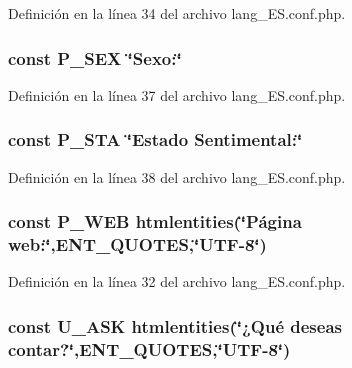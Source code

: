 Definición en la línea 34 del archivo lang\-\_\-\-E\-S.\-conf.\-php.

\hypertarget{lang__ES_8conf_8php_a695823c4efbb40f67bf068989d78c024}{
\subsubsection[{P\-\_\-\-S\-E\-X}]{\setlength{\rightskip}{0pt plus 5cm}const P\-\_\-\-S\-E\-X \char`\"{}Sexo\-:\char`\"{}}}\label{lang__ES_8conf_8php_a695823c4efbb40f67bf068989d78c024}


Definición en la línea 37 del archivo lang\-\_\-\-E\-S.\-conf.\-php.

\hypertarget{lang__ES_8conf_8php_a77097762c49f00afdf8fe7fd23b3498c}{
\subsubsection[{P\-\_\-\-S\-T\-A}]{\setlength{\rightskip}{0pt plus 5cm}const P\-\_\-\-S\-T\-A \char`\"{}Estado Sentimental\-:\char`\"{}}}\label{lang__ES_8conf_8php_a77097762c49f00afdf8fe7fd23b3498c}


Definición en la línea 38 del archivo lang\-\_\-\-E\-S.\-conf.\-php.

\hypertarget{lang__ES_8conf_8php_ade9836b8897b65809f548b7781e977e2}{
\subsubsection[{P\-\_\-\-W\-E\-B}]{\setlength{\rightskip}{0pt plus 5cm}const P\-\_\-\-W\-E\-B htmlentities(\char`\"{}Página web\-:\char`\"{},E\-N\-T\-\_\-\-Q\-U\-O\-T\-E\-S,\char`\"{}U\-T\-F-\/8\char`\"{})}}\label{lang__ES_8conf_8php_ade9836b8897b65809f548b7781e977e2}


Definición en la línea 32 del archivo lang\-\_\-\-E\-S.\-conf.\-php.

\hypertarget{lang__ES_8conf_8php_aade6029224a1af2dbad53ec0d454186f}{
\subsubsection[{U\-\_\-\-A\-S\-K}]{\setlength{\rightskip}{0pt plus 5cm}const U\-\_\-\-A\-S\-K htmlentities(\char`\"{}¿Qué deseas contar?\char`\"{},E\-N\-T\-\_\-\-Q\-U\-O\-T\-E\-S,\char`\"{}U\-T\-F-\/8\char`\"{})}}\label{lang__ES_8conf_8php_aade6029224a1af2dbad53ec0d454186f}


